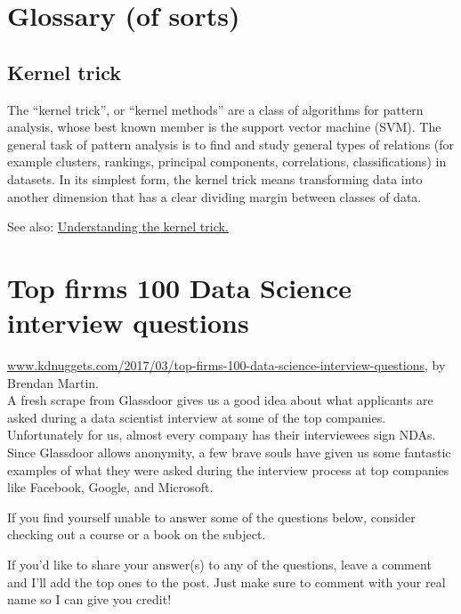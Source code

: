 \documentclass[11pt]{article}
\begin{document}
\newpage
\section{Glossary (of sorts)}

\subsection*{Kernel trick}
The ``kernel trick'', or ``kernel methods'' are a class of algorithms
for pattern analysis, whose best known member is the support vector
machine (SVM). The general task of pattern analysis is to find and
study general types of relations (for example clusters, rankings,
principal components, correlations, classifications) in datasets. In
its simplest form, the kernel trick means transforming data into
another dimension that has a clear dividing margin between classes of
data.

\smallskip
\smallskip
\noindent
See also: \href{https://towardsdatascience.com/understanding-the-kernel-trick-e0bc6112ef78}{Understanding the kernel trick.}



\newpage
\section{Top firms 100 Data Science interview questions}
\href{http://www.kdnuggets.com/2017/03/top-firms-100-data-science-interview-questions.html}{www.kdnuggets.com/2017/03/top-firms-100-data-science-interview-questions}, by Brendan Martin.\\

A fresh scrape from Glassdoor gives us a good idea about what
applicants are asked during a data scientist interview at some of the
top companies. Unfortunately for us, almost every company has their
interviewees sign NDAs. Since Glassdoor allows anonymity, a few brave
souls have given us some fantastic examples of what they were asked
during the interview process at top companies like Facebook, Google,
and Microsoft.

If you find yourself unable to answer some of the questions below,
consider checking out a course or a book on the subject.

If you’d like to share your answer(s) to any of the questions, leave a
comment and I’ll add the top ones to the post. Just make sure to
comment with your real name so I can give you credit!
\end{document}
